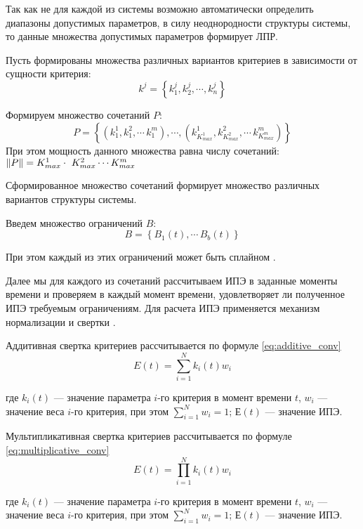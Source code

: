 Так как не для каждой из системы возможно автоматически определить диапазоны допустимых параметров, 
в силу неоднородности структуры системы, то данные множества допустимых параметров формирует ЛПР.

Пусть формированы множества различных вариантов критериев в зависимости от сущности критерия:
\begin{equation}
    k^j=\left\{ k_1^j,k_2^j, \cdots ,k_n^j \right\}
\end{equation}

Формируем множество сочетаний $P$: 
\begin{equation}
    P=\left\{ (k^1_1, k^2_1, \cdots\, k^m_1), \cdots , (k^1_{K^1_{max}}, k^2_{K^2_{max}}, \cdots\, k^m_{K^m_{max}}) \right\}
\end{equation}
При этом мощность данного множества равна числу сочетаний: $ \norm{P} = K^1_{max} \cdot \ K^2_{max} \cdots  K^m_{max} $

Сформированное множество сочетаний формирует множество различных вариантов структуры системы.

Введем множество ограничений $B$:
\begin{equation}
    B = \left\{ B_1(t),\cdots\, B_b(t) \right\} 
\end{equation}

При этом каждый из этих ограничений может быть сплайном \cite{Degradation}.

Далее мы для каждого из сочетаний рассчитываем ИПЭ в заданные моменты времени и проверяем в каждый момент времени, удовлетворяет ли полученное ИПЭ требуемым ограничениям.
Для расчета ИПЭ применяется механизм нормализации и свертки \cite{Degradation}.

Аддитивная свертка критериев рассчитывается по формуле \ref{eq:additive_conv}
\begin{equation}
    \label{eq:additive_conv}
    E(t) = \sum^N_{i=1} k_i(t) w_i
\end{equation}

\noindent
где $k_i(t)$ --- значение параметра $i$-го критерия в момент времени $t$,
$w_i$ --- значение веса $i$-го критерия, при этом $\sum^N_{i=1} w_i = 1$; 
$Е(t)$ --- значение ИПЭ.

Мультипликативная свертка критериев рассчитывается по формуле \ref{eq:multiplicative_conv}
\begin{equation}
    \label{eq:multiplicative_conv}
    E(t) = \prod^N_{i=1} k_i(t) w_i 
\end{equation}

\noindent
где $k_i(t)$ --- значение параметра $i$-го критерия в момент времени $t$,
$w_i$ --- значение веса $i$-го критерия, при этом $\sum^N_{i=1} w_i = 1$; 
$Е(t)$ --- значение ИПЭ.

